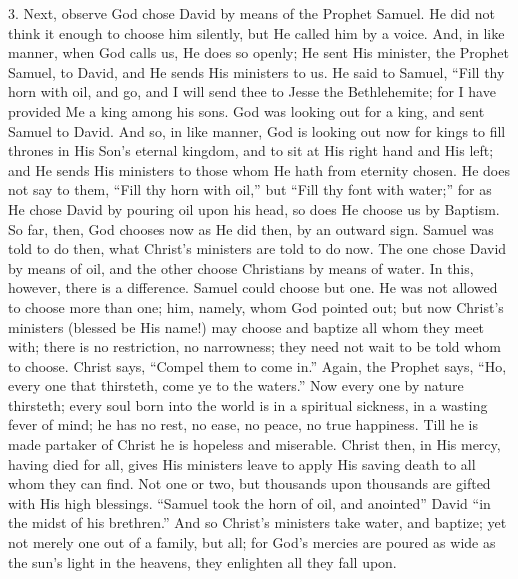 3. Next, observe God chose David by means of the Prophet Samuel. He
did not think it enough to choose him silently, but He called him by a
voice. And, in like manner, when God calls us, He does so openly; He
sent His minister, the Prophet Samuel, to David, and He sends His
ministers to us. He said to Samuel, ``Fill thy horn with oil, and
go, and I will send thee to Jesse the Bethlehemite; for I have
provided Me a king among his sons. God was looking out for a king, and
sent Samuel to David. And so, in like manner, God is looking out now
for kings to fill thrones in His Son's eternal kingdom, and to sit at
His right hand and His left; and He sends His ministers to those whom
He hath from eternity chosen. He does not say to them, ``Fill thy
horn with oil,'' but ``Fill thy font with water;'' for as
He chose David by pouring oil upon his head, so does He choose us by
Baptism. So far, then, God chooses now as He did then, by an outward
sign. Samuel was told to do then, what Christ's ministers are told to
do now. The one chose David by means of oil, and the other choose
Christians by means of water. In this, however, there is a difference.
Samuel could choose but one. He was not allowed to choose more than
one; him, namely, whom God pointed out; but now Christ's ministers
(blessed be His name!) may choose and baptize all whom they meet with;
there is no restriction, no narrowness; they need not wait to be told
whom to choose. Christ says, ``Compel them to come in.''
Again, the Prophet says, ``Ho, every one that thirsteth, come ye
to the waters.'' Now every one by nature thirsteth; every soul
born into the world is in a spiritual sickness, in a wasting fever of
mind; he has no rest, no ease, no peace, no true happiness. Till he is
made partaker of Christ he is hopeless and miserable. Christ then, in
His mercy, having died for all, gives His ministers leave to apply
His
saving death to all whom they can find. Not one or two, but thousands
upon thousands are gifted with His high blessings. ``Samuel took
the horn of oil, and anointed'' David ``in the midst of his
brethren.'' And so Christ's ministers take water, and baptize; yet
not merely one out of a family, but all; for God's mercies are poured
as wide as the sun's light in the heavens, they enlighten all they
fall upon.

